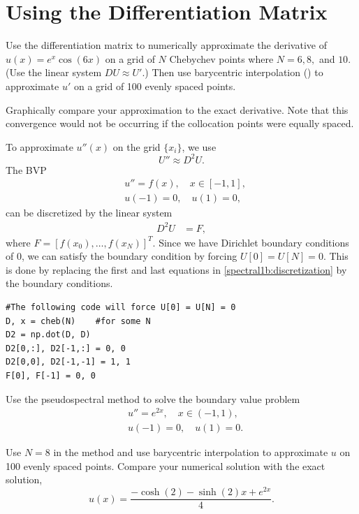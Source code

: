 \section*{Using the Differentiation Matrix}


\begin{problem}
Use the differentiation matrix to numerically approximate the derivative of $u(x) = e^{x}\cos(6x)$ on a grid of $N$ Chebychev points where $N=6, 8,$ and $10.$
(Use the linear system $D U \approx U'$.)
Then use barycentric interpolation () to approximate $u'$ on a grid of 100 evenly spaced points.

Graphically compare your approximation to the exact derivative.
Note that this convergence would not be occurring if the collocation points were equally spaced.
\end{problem}

To approximate $u''(x)$ on the grid $\{x_i\}$, we use
\[U'' \approx D^2 U.\]
The BVP
\begin{align*}
&{ }u'' = f(x), \quad x \in [-1,1],\\
&{ }u(-1) = 0, \quad u(1) = 0,
\end{align*}
can be discretized by the linear system
\begin{align}
	D^2 U &= F, \label{spectral1b:discretization}
\end{align}
where $F = [f(x_0),\ldots, f(x_N)]^T$.
Since we have Dirichlet boundary conditions of $0$, we can satisfy the boundary condition by forcing $U[0] = U[N] = 0$.
This is done by replacing the first and last equations in \eqref{spectral1b:discretization} by the boundary conditions.

\begin{lstlisting}
#The following code will force U[0] = U[N] = 0
D, x = cheb(N)    #for some N
D2 = np.dot(D, D)
D2[0,:], D2[-1,:] = 0, 0
D2[0,0], D2[-1,-1] = 1, 1
F[0], F[-1] = 0, 0
\end{lstlisting}


\begin{problem}
Use the pseudospectral method to solve the boundary value problem
\begin{align*}
&{ } u'' = e^{2x}, \quad x \in (-1,1), \\
&{ } u(-1) = 0, \quad u(1) = 0.
\end{align*}

Use $N=8$ in the  method and use barycentric interpolation to approximate $u$ on 100 evenly spaced points.
Compare your numerical solution with the exact solution,
\[
u(x) = \frac{- \cosh(2) - \sinh(2)x + e^{2x}}{4}.
\]
\end{problem}


